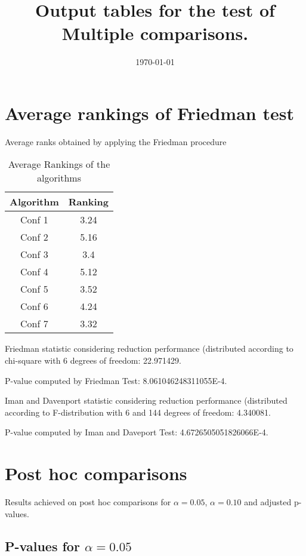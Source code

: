 \documentclass[a4paper,10pt]{article}
\title{Output tables for the test of Multiple comparisons.}
\author{}
\date{\today}
\begin{document}
\begin{landscape}
\pagestyle{empty}
\maketitle
\thispagestyle{empty}
\section{Average rankings of Friedman test}



Average ranks obtained by applying the Friedman procedure

\begin{table}[!htp]
\centering
\begin{tabular}{|c|c|}\hline
Algorithm&Ranking\\\hline
Conf 1 & 3.24\\
Conf 2 & 5.16\\
Conf 3 & 3.4\\
Conf 4 & 5.12\\
Conf 5 & 3.52\\
Conf 6 & 4.24\\
Conf 7 & 3.32\\
\hline
\end{tabular}
\caption{Average Rankings of the algorithms}
\end{table}

Friedman statistic considering reduction performance (distributed according to chi-square with 6 degrees of freedom: 22.971429.

P-value computed by Friedman Test: 8.061046248311055E-4.\newline

Iman and Davenport statistic considering reduction performance (distributed according to F-distribution with 6 and 144 degrees of freedom: 4.340081.

P-value computed by Iman and Daveport Test: 4.6726505051826066E-4.\newline



\pagebreak

\section{Post hoc comparisons}

Results achieved on post hoc comparisons for $\alpha = 0.05$, $\alpha = 0.10$ and adjusted p-values.

\subsection{P-values for $\alpha=0.05$}


\end{landscape}
\end{document}
